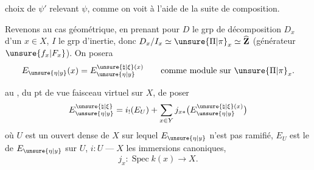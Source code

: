 choix de $\psi'$ relevant $\psi$, comme on voit à l'aide de la suite de composition.


Revenons au cas géométrique, en prenant pour $D$ le grp de décomposition $D_x$ d'un $x\in X$, $I$ le grp d'inertie, donc $D_x/I_x\simeq\unsure{\Pi|\pi}_x\simeq\widehat{\mathbf{Z}}$ (générateur $\unsure{f_x|F_x}$). On posera
\[
E_{\unsure{\eta|y}}(x)=E_{\unsure{\eta|y}}^{\unsure{\natural|\xi}(x)}\qquad\text{comme module sur }\unsure{\Pi|\pi}_x.
\]

 au , du pt de vue faisceau virtuel sur $X$, de poser
\[
E_{\unsure{\eta|y}}^{\unsure{\natural|\xi}}=i_!(E_U)+\sum_{x\in Y}j_{x*}\bigl(E_{\unsure{\eta|y}}^{\unsure{\natural|\xi}(x)}\bigr)
\]
où $U$ est un ouvert dense de $X$ sur lequel $E_{\unsure{\eta|y}}$ n'est pas ramifié, $E_U$ est le  de $E_{\unsure{\eta|y}}$ sur $U$,  $i:U\mathrel{\text{---}}X$  les immersions canoniques,
\[
j_x:\operatorname{Spec} k(x)\longrightarrow X.
\]



